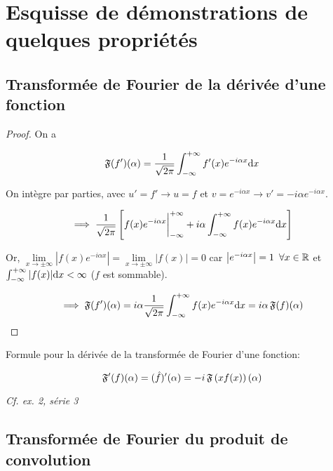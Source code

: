\section{Esquisse de démonstrations de quelques propriétés}

\subsection{Transformée de Fourier de la dérivée d'une fonction}

\begin{proof}
    On a
    
    \[
    \mathfrak{F}(f')(\alpha) =
    \frac{1}{\sqrt{2 \pi}} \int_{-\infty}^{+\infty} f'(x) e^{-i\alpha x} \mathrm{d}x
    \]
    
    On intègre par parties, avec $u' = f' \rightarrow u = f$ et $v = e^{-i\alpha x} \rightarrow v' = -i \alpha e^{-i\alpha x}$.
    
    \[
    \implies \frac{1}{\sqrt{2 \pi}} \left[
    f(x) e^{-i\alpha x} \bigg|_{-\infty}^{+\infty} +
    i\alpha \int_{-\infty}^{+\infty} f(x)e^{-i\alpha x} \mathrm{d}x
    \right]
    \]
    
    Or, $\lim\limits_{x \rightarrow \pm \infty} \left| f(x) e^{-i\alpha x}\right| = \lim\limits_{x \rightarrow \pm \infty} \left|f(x)\right| = 0$ car $\left|e^{-i\alpha x}\right| = 1 \enspace \forall x\in \mathbb{R}$ et $\int_{-\infty}^{+\infty} |f(x)| \mathrm{d}x < \infty$ ($f$ est sommable).
    
    \[
    \implies \mathfrak{F}(f')(\alpha) = i\alpha \frac{1}{\sqrt{2 \pi}} \int_{-\infty}^{+\infty} f(x) e^{-i\alpha x} \mathrm{d}x = i\alpha \, \mathfrak{F}(f)(\alpha)
    \]
\end{proof}

\begin{remark}
    Formule pour la dérivée de la transformée de Fourier d'une fonction:
    
    \[\mathfrak{F}'(f)(\alpha) = (\hat{f})'(\alpha) = -i \, \mathfrak{F}\left(xf(x)\right)(\alpha)\]
    
    \textit{Cf. ex. 2, série 3}
\end{remark}


\subsection{Transformée de Fourier du produit de convolution}

